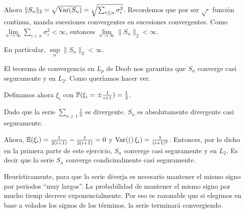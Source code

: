 Ahora $\| S_n \|_2 = \sqrt{\text{Var}\! \left( S_n \right)} = \sqrt{\sum_{i \leq n} \sigma_i^2}$. Recordemos que por ser  $\sqrt{\cdot}$
función continua, manda sucesiones convergentes en sucesiones convergentes. Como 
$\lim\limits_{n \rightarrow \infty} \sum\limits_{i < n} \sigma_i^2 < \infty$, 
entonces $\lim\limits_{n \rightarrow \infty}\| S_n \|_2 < \infty$.\pn

En particular, $\sup\limits_n \| S_n \|_2 < \infty$.\pn

El teorema de convergencia en $L_p$ de Doob nos garantiza que $S_n$ converge casi seguramente y en $L_2$. Como queríamos
hacer ver.\pn

Definamos ahora $\xi_i$ con $\mathbb{P}(\xi_i = \pm \frac{1}{i+1}) = \frac{1}{2}$.

Dado que la serie $\sum_{n \geq 1} \frac{1}{n}$ es divergente. $S_n$ es absolutamente divergente casi seguramente.\pn

Ahora, $\mathbb{E}(\xi_i) = \frac{1}{2(i+1)}-\frac{1}{2(i+1)} = 0$ y $\text{Var}\! \left( ( \right)\xi_i) = \frac{1}{(i+1)^2}$. Entonces, por lo dicho en la primera
parte de este ejercicio, $S_n$ converge casi seguramente y en $L_2$. Es decir que la serie $S_n$ converge condicinalmente casi seguramente.

Heurísticamente, para que la serie diverja es necesario mantener el mismo signo por periodos ``muy largos''. La probabilidad de mantener el 
mismo signo por mucho tiemp decrece exponencialmente. Por eso es razonable que si elegimos en base a volados los signos de los términos,
la serie terminará convergiendo.
